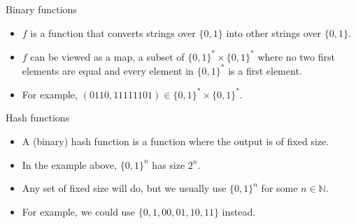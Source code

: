 \begin{frame}{Binary functions}

  \begin{itemize}
    \item $f$ is a function that converts strings over $\{0,1\}$ into other strings over $\{0,1\}$.
    \item $f$ can be viewed as a map, a subset of $\{0,1\}^* \times \{0,1\}^*$ where no two first elements are equal and every element in $\{0,1\}^*$ is a first element.
    \item For example, $(0110,11111101) \in \{0,1\}^* \times \{0,1\}^*$.
  \end{itemize}
\end{frame}


\begin{frame}{Hash functions}

  \begin{itemize}
    \item A (binary) hash function is a function where the output is of fixed size.
    \item In the example above, $\{0,1\}^n$ has size $2^n$.
    \item Any set of fixed size will do, but we usually use $\{0,1\}^n$ for some $n \in \mathbb{N}$.
    \item For example, we could use $\{0, 1, 00, 01, 10, 11\}$ instead.
  \end{itemize}
\end{frame}

